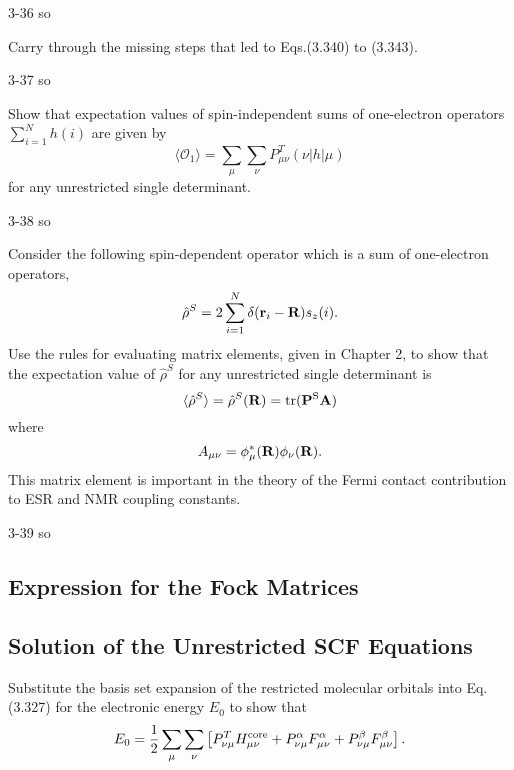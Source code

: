 \documentclass[a4paper]{book}
\newcommand\tr[1]{\mathrm{tr(#1)}}
\newcommand{\core}{{\rm core}}
\newcommand{\R}{{\bf R}}
\begin{document}
	\begin{solution}
		3-36 so
	\end{solution}
	
	\begin{exercise}
	Carry through the missing steps that led to Eqs.(3.340) to (3.343).
	\end{exercise}
	
	\begin{solution}
		3-37 so
	\end{solution}
	
	\begin{exercise}
	Show that expectation values of spin-independent sums of one-electron operators $\sum_{i=1}^N h(i)$ are given by
	\[
		\langle \mathscr{O}_1 \rangle = \sum_\mu \sum_\nu P^T_{\mu\nu} ( \nu | h | \mu )
	\]
	for any unrestricted single determinant.
	\end{exercise}
	
	\begin{solution}
		3-38 so
	\end{solution}
	
	\begin{exercise}
	Consider the following spin-dependent operator which is a sum of one-electron operators,
	\[
		\hat{\rho}^S = 2 \sum_{i=1}^N \delta( {\bf r}_i - {\bf R} )s_z(i).
	\]
	Use the rules for evaluating matrix elements, given in Chapter 2, to show that the expectation value of $\hat{\rho}^S$ for any unrestricted single determinant is
	\[
		\langle \hat{\rho}^S \rangle = \hat{\rho}^S ({\bf R}) = \tr{  {\bf P}^S {\bf A}} 
	\]
	where
	\[
		A_{\mu\nu} = \phi^*_\mu (\R) \phi_\nu (\R).
	\]
	This matrix element is important in the theory of the Fermi contact contribution to ESR and NMR coupling constants.
	\end{exercise}
	
	\begin{solution}
		3-39 so
	\end{solution}
	
	\subsection{Expression for the Fock Matrices}
	
	\subsection{Solution of the Unrestricted SCF Equations}
	
	\begin{exercise}
	Substitute the basis set expansion of the restricted molecular orbitals into Eq.(3.327) for the electronic energy $E_0$ to show that
	\[
		E_0 = \frac{1}{2} \sum_\mu \sum_\nu \left[ P^T_{\nu\mu} H^{\core}_{\mu\nu} + P^\alpha_{\nu\mu} F^\alpha_{\mu\nu} + P^\beta_{\nu\mu} F^\beta_{\mu\nu} \right].
	\]
	\end{exercise}
	
\end{document}
